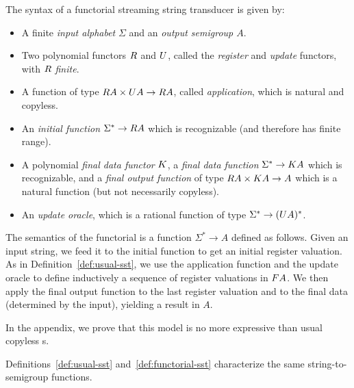 \begin{definition}\label{def:functorial-sst}
    The syntax of a functorial streaming string transducer is given by:
    \begin{itemize}
        \item A finite \emph{input alphabet} $\Sigma$ and an \emph{output semigroup $A$}.
    \item Two polynomial functors $\functorr$ and $\functoru$, called the \emph{register} and \emph{update} functors, with $\functorr$ \emph{finite}.
    \item A function of type $\functorr A \times \functoru A \to \functorr A$, called \emph{application}, which is natural and copyless.
    \item An \emph{initial function} $\Sigma^* \to \functorr A$ which is recognizable (and therefore has finite range).
    \item A polynomial \emph{final data functor} $\functork$, a \emph{final data function} $\Sigma^* \to \functork A$ which is recognizable, and a \emph{final output function} of type $\functorr A \times \functork A \to A$ which is a natural function (but not necessarily copyless).
    \item An \emph{update oracle}, which is a rational function of type $\Sigma^* \to (\functoru A)^*$.
    \end{itemize}
\end{definition}
The semantics of the functorial \sst is a function 
$\Sigma^* \to A$ defined as follows. Given an input string, we feed it to the
initial function to get an initial register valuation. As in
Definition~\ref{def:usual-sst}, we use the application function and the update
oracle to define inductively a sequence of register valuations in $\functor A$.
We then apply the final output function to the last register valuation and to the
final data (determined by the input), yielding a result in $A$.

In the appendix, we prove that this model is no more expressive than usual
copyless \sst{}s.

\begin{lemma}\label{lem:functorial-sst-complete}
    Definitions~\ref{def:usual-sst} and~\ref{def:functorial-sst} characterize the same string-to-semigroup functions.
\end{lemma}

